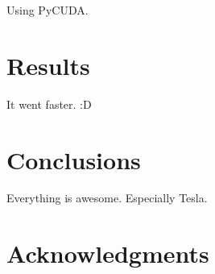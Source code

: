 \documentclass[12pt]{article}
\begin{document}
Using PyCUDA. %

\section{Results}

It went faster. :D %


\section{Conclusions}
Everything is awesome. Especially Tesla.

\section{Acknowledgments}

\end{document}
